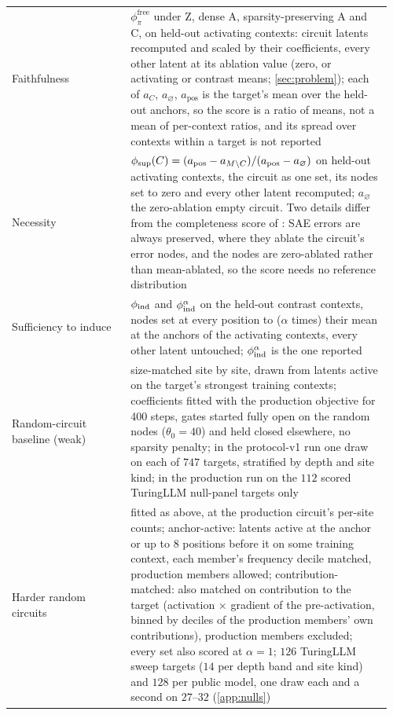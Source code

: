 \documentclass[10pt]{article}
\begin{document}
{\begin{longtable}{@{}p{0.30\linewidth}p{0.66\linewidth}@{}}
Faithfulness & $\phi^{\mathrm{free}}_{\pi}$ under Z, dense A, sparsity-preserving A and C, on held-out activating contexts: circuit latents recomputed and scaled by their coefficients, every other latent at its ablation value (zero, or activating or contrast means; \cref{sec:problem}); each of $a_C$, $a_{\varnothing}$, $a_{\mathrm{pos}}$ is the target's mean over the held-out anchors, so the score is a ratio of means, not a mean of per-context ratios, and its spread over contexts within a target is not reported \\
Necessity & $\phi_{\mathrm{sup}}(C) = (a_{\mathrm{pos}} - a_{M \setminus C}) / (a_{\mathrm{pos}} - a_{\varnothing})$ on held-out activating contexts, the circuit as one set, its nodes set to zero and every other latent recomputed; $a_{\varnothing}$ the zero-ablation empty circuit. Two details differ from the completeness score of \citet{marks2025sparse}: SAE errors are always preserved, where they ablate the circuit's error nodes, and the nodes are zero-ablated rather than mean-ablated, so the score needs no reference distribution \\
Sufficiency to induce & $\phi_{\mathrm{ind}}$ and $\phi_{\mathrm{ind}}^{\alpha}$ on the held-out contrast contexts, nodes set at every position to ($\alpha$ times) their mean at the anchors of the activating contexts, every other latent untouched; $\phi_{\mathrm{ind}}^{\alpha}$ is the one reported \\
Random-circuit baseline (weak) & size-matched site by site, drawn from latents active on the target's strongest training contexts; coefficients fitted with the production objective for 400 steps, gates started fully open on the random nodes ($\theta_0 = 40$) and held closed elsewhere, no sparsity penalty; in the protocol-v1 run one draw on each of $747$ targets, stratified by depth and site kind; in the production run on the $112$ scored TuringLLM null-panel targets only \\
Harder random circuits & fitted as above, at the production circuit's per-site counts; anchor-active: latents active at the anchor or up to 8 positions before it on some training context, each member's frequency decile matched, production members allowed; contribution-matched: also matched on contribution to the target (activation $\times$ gradient of the pre-activation, binned by deciles of the production members' own contributions), production members excluded; every set also scored at $\alpha = 1$; $126$ TuringLLM sweep targets ($14$ per depth band and site kind) and $128$ per public model, one draw each and a second on $27$--$32$ (\cref{app:nulls}) \\

\end{longtable}}
\end{document}
